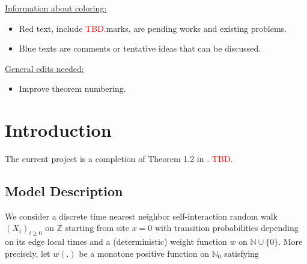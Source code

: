 \documentclass[twoside,12pt,a4paper]{article}
\numberwithin{equation}{section}
\newcommand\TBD{\textcolor{red}{TBD.}}
\begin{document}
	\maketitle

	\setcounter{page}{1} 
	
	\begin{abstract}
		This document is an outline of the article for the Scaling limit of SIRW. We complete the functional CLT in \cite{KMP22} for the asymptotically free self-interacting random walk (AF-SIRW) in the case $0<p \leq \frac{1}{2}$. The approach is to carefully approximate the local drifts of the random walk via the study of the directed edge local times, which are described by branching-like processes and generalized Ray-knight Theorems. Xiaoyu Liu and Zhe Wang are working on this project. 
		\TBD
	\end{abstract}
	
	\underline{\textsf{Information about coloring:}}
	\begin{itemize}
		\item 
	\textsf{\color{red} Red text, include \TBD marks, are pending works and existing problems.}
		\item 
			\textsf{\color{blue} Blue texts are comments or tentative ideas that can be discussed.}
	\end{itemize}

	\textsf{\underline{General edits needed:}}
	\begin{itemize}
		\item Improve theorem numbering.
	\end{itemize}

	
	\section{Introduction}
	The current project is a completion of Theorem 1.2 in \cite{KMP22}. 
	\TBD 
	
	
	\subsection{Model Description} 
	We consider a discrete time nearest neighbor self-interaction random walk $(X_i)_{i\geq 0}$ on $\mathbb{Z}$ starting from site $x=0$ with transition probabilities depending on its edge local times and a (deterministic) weight function $w$ on $\mathbb{N}\cup \{0\}$. More precisely, let $w(.)$ be a monotone positive function on $\mathbb{N}_0$ satisfying
	
\end{document}

